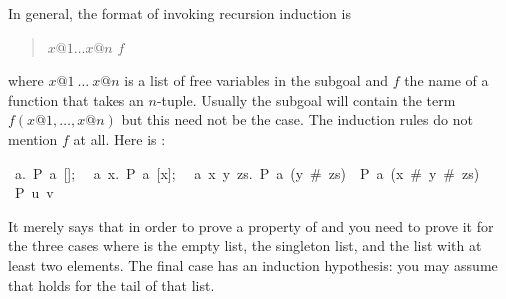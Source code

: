 \begin{isabellebody}
\begin{isamarkuptext}
In general, the format of invoking recursion induction is
\begin{quote}
 $x@1 \dots x@n$  $f$
\end{quote}%
where $x@1~\dots~x@n$ is a list of free variables in the subgoal and $f$ the
name of a function that takes an $n$-tuple. Usually the subgoal will
contain the term $f(x@1,\dots,x@n)$ but this need not be the case. The
induction rules do not mention $f$ at all. Here is :
\begin{isabelle}
{\isasymlbrakk}~{\isasymAnd}a.~P~a~[];\isanewline
~~{\isasymAnd}a~x.~P~a~[x];\isanewline
~~{\isasymAnd}a~x~y~zs.~P~a~(y~\#~zs)~{\isasymLongrightarrow}~P~a~(x~\#~y~\#~zs){\isasymrbrakk}\isanewline
{\isasymLongrightarrow}~P~u~v%
\end{isabelle}
It merely says that in order to prove a property  of  and
 you need to prove it for the three cases where  is the
empty list, the singleton list, and the list with at least two elements.
The final case has an induction hypothesis:  you may assume that 
holds for the tail of that list.%
\end{isamarkuptext}%
\isamarkuptrue%
\isamarkupfalse%
\end{isabellebody}%

